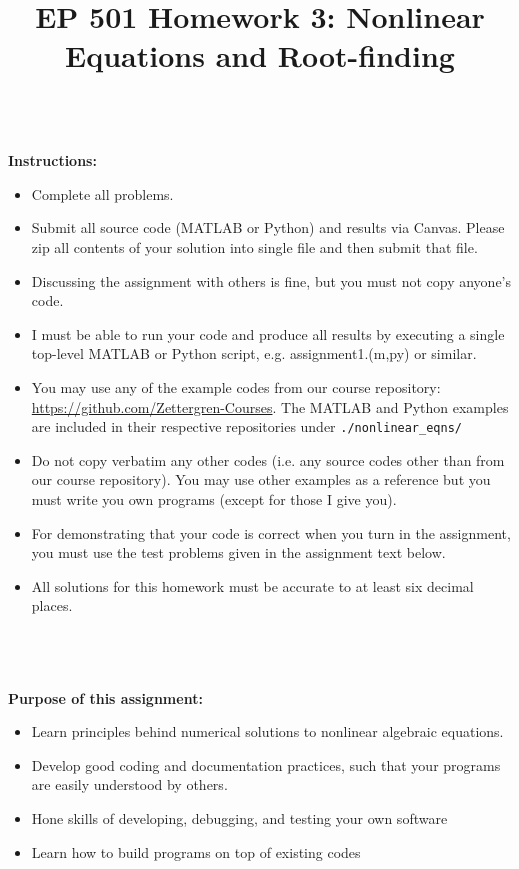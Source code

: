 \documentclass{article}
\begin{document}
\title{EP 501 Homework 3:  Nonlinear Equations and Root-finding}

\maketitle

~\\
\textbf{Instructions:}  
\begin{itemize}
  \item Complete all problems.
  \item Submit all source code (MATLAB or Python) and results via Canvas.  Please zip all contents of your solution into single file and then submit that file.    
  \item Discussing the assignment with others is fine, but you must not copy anyone's code.  
  \item I must be able to run your code and produce all results by executing a single top-level MATLAB or Python script, e.g. \textsf{assignment1.(m,py)} or similar.  
  \item You may use any of the example codes from our course repository:  \url{https://github.com/Zettergren-Courses}.  The MATLAB and Python examples are included in their respective repositories under \texttt{./nonlinear\_eqns/}
  \item Do not copy verbatim any other codes (i.e. any source codes other than from our course repository).  You may use other examples as a reference but you must write you own programs (except for those I give you).  
    \item For demonstrating that your code is correct when you turn in the assignment, you must use the test problems given in the assignment text below.  
    \item  All solutions for this homework must be accurate to at least six decimal places.  

\end{itemize}
~\\~\\~\\
\textbf{Purpose of this assignment:}  
\begin{itemize}
  \item Learn principles behind numerical solutions to nonlinear algebraic equations.  
  \item Develop good coding and documentation practices, such that your programs are easily understood by others.  
  \item Hone skills of developing, debugging, and testing your own software
  \item Learn how to build programs on top of existing codes
\end{itemize}
\end{document}
